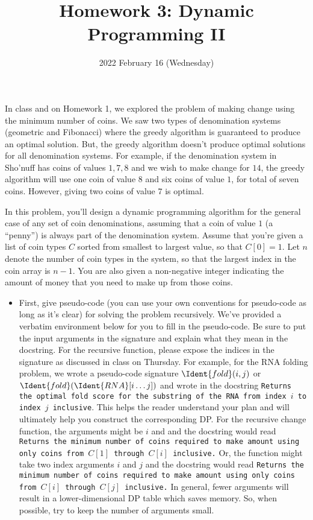 \documentclass{ks-pset}
\title{Homework 3: Dynamic Programming II}
\author{}
\date{2022 February 16 (Wednesday)}
\begin{document}
\begin{problem}

  In class and on Homework 1, we explored the problem of making change using
  the minimum number of coins.  We saw two types of denomination systems
  (geometric and Fibonacci) where the greedy algorithm is guaranteed to produce
  an optimal solution.  But, the greedy algorithm doesn't produce optimal
  solutions for all denomination systems.  For example, if the denomination
  system in Sho'nuff has coins of values \(1, 7, 8\) and we wish to make change
  for \(14\), the greedy algorithm will use one coin of value \(8\) and six
  coins of value \(1\), for total of seven coins.  However, giving two coins of
  value \(7\) is optimal.

  In this problem, you'll design a dynamic programming algorithm for the
  general case of any set of coin denominations, assuming that a coin of value
  \(1\) (a ``penny'') is always part of the denomination system.  Assume that
  you're given a list of coin types \(C\) sorted from smallest to largest
  value, so that \(C[0] = 1\).  Let \(n\) denote the number of coin types in
  the system, so that the largest index in the coin array is \(n-1\).  You are
  also given a non-negative integer  indicating the amount of
  money that you need to make up from those coins.

  \begin{itemize}

    \item First, give pseudo-code (you can use your own conventions for
      pseudo-code as long as it's clear) for solving the problem recursively.
      We've provided a verbatim environment below for you to fill in the
      pseudo-code.  Be sure to put the input arguments in the signature and
      explain what they mean in the docstring.  For the recursive function,
      please expose the indices in the signature as discussed in class on
      Thursday.  For example, for the RNA folding problem, we wrote a
      pseudo-code signature \(\Ident{fold}(i, j)\) or
      \(\Ident{fold}(\Ident{RNA}[i\dotso j])\) and wrote in the docstring
      \texttt{Returns the optimal fold score for the substring of the RNA from
      index \(i\) to index \(j\) inclusive}.  This helps the reader understand
      your plan and will ultimately help you construct the corresponding DP.
      For the recursive change function, the arguments might be \(i\) and
       and the docstring would read \texttt{Returns the minimum
        number of coins required to make amount using only coins from \(C[1]\)
      through \(C[i]\) inclusive.} Or, the function might take two index
      arguments \(i\) and \(j\) and the docstring would read \texttt{Returns
        the minimum number of coins required to make amount using only coins
      from \(C[i]\) through \(C[j]\) inclusive.}  In general, fewer arguments
      will result in a lower-dimensional DP table which saves memory. So,
      when possible, try to keep the number of arguments small.


\end{itemize}
\end{problem}
\end{document}
